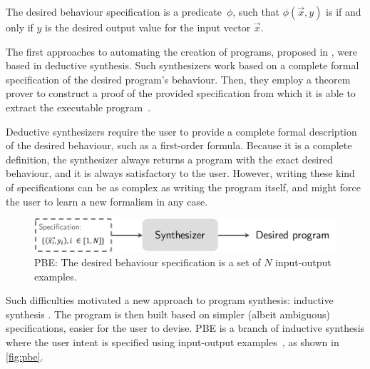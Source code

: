 \begin{definition}
The desired behaviour specification is a predicate~\(\phi\), such that \(\phi(\vec{x}, y)\) is \true{} if and only if \(y\) is the desired output value for the input vector \(\vec{x}\).
\end{definition}

\noindent
The first approaches to automating the creation of programs, proposed in \citeyear{DBLP:conf/ijcai/Green69} \cite{DBLP:conf/ijcai/Green69,DBLP:conf/ijcai/WaldingerL69}, were based in deductive synthesis.
Such synthesizers work based on a complete formal specification of the desired program's behaviour.
Then, they employ a theorem prover to construct a proof of the provided specification from which it is able to extract the executable program~\cite{DBLP:conf/ijcai/Green69,DBLP:journals/cacm/MannaW71,DBLP:journals/toplas/MannaW80,DBLP:conf/ijcai/WaldingerL69}.

Deductive synthesizers require the user to provide a complete formal description of the desired behaviour, such as a first-order formula.
Because it is a complete definition, the synthesizer always returns a program with the exact desired behaviour, and it is always satisfactory to the user.
However, writing these kind of specifications can be as complex as writing the program itself, and might force the user to learn a new formalism in any case.

\begin{figure}
    \centering
    \includegraphics[scale=.35]{pictures/pbe.pdf}
    \caption{\ac{PBE}: The desired behaviour specification is a set of \(N\) input-output examples.}
    \label{fig:pbe}
\end{figure}

Such difficulties motivated a new approach to program synthesis: inductive synthesis \cite{DBLP:conf/pldi/FengMBD18,DBLP:conf/pldi/FengMGDC17,DBLP:conf/ijcai/ShawWG75,DBLP:journals/jacm/Summers77,UnchartIt20,Orvalho19,DBLP:journals/pvldb/OrvalhoTVMM20,AlphaRegex16,DanielThesis,PedroThesis}. The program is then built based on simpler (albeit ambiguous) specifications, easier for the user to devise. \acf{PBE} is a branch of inductive synthesis where the user intent is specified using input-output examples~\cite{DBLP:conf/pldi/GodefroidT12,DBLP:conf/ijcai/ShawWG75,DBLP:journals/jacm/Summers77,DBLP:conf/sigmod/WangCB17,DBLP:conf/pldi/WangCB17,DBLP:conf/pldi/FeserCD15,DBLP:conf/aaai/MortonHSPS20}, as shown in \autoref{fig:pbe}.

